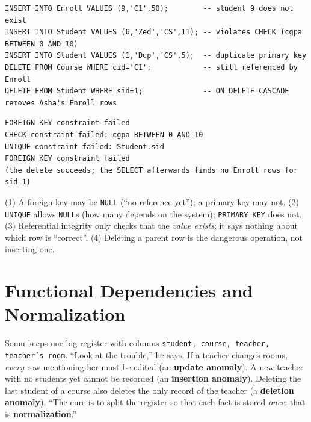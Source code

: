 \documentclass[11pt,a4paper]{article}
\begin{document}
\begin{lstlisting}[style=sql]
INSERT INTO Enroll VALUES (9,'C1',50);        -- student 9 does not exist
INSERT INTO Student VALUES (6,'Zed','CS',11); -- violates CHECK (cgpa BETWEEN 0 AND 10)
INSERT INTO Student VALUES (1,'Dup','CS',5);  -- duplicate primary key
DELETE FROM Course WHERE cid='C1';            -- still referenced by Enroll
DELETE FROM Student WHERE sid=1;              -- ON DELETE CASCADE removes Asha's Enroll rows
\end{lstlisting}
\begin{lstlisting}[style=out]
FOREIGN KEY constraint failed
CHECK constraint failed: cgpa BETWEEN 0 AND 10
UNIQUE constraint failed: Student.sid
FOREIGN KEY constraint failed
(the delete succeeds; the SELECT afterwards finds no Enroll rows for sid 1)
\end{lstlisting}
\begin{trap}
(1) A foreign key may be \texttt{NULL} (``no reference yet''); a primary key may not. (2) \texttt{UNIQUE} allows \texttt{NULL}s (how many depends on the system); \texttt{PRIMARY KEY} does not. (3) Referential integrity only checks that the \emph{value exists}; it says nothing about which row is ``correct''. (4) Deleting a parent row is the dangerous operation, not inserting one.
\end{trap}
\section{Functional Dependencies and Normalization}

\begin{story}
Somu keeps one big register with columns \texttt{student, course, teacher, teacher's room}. ``Look at the trouble,'' he says. If a teacher changes rooms, \emph{every} row mentioning her must be edited (an \textbf{update anomaly}). A new teacher with no students yet cannot be recorded (an \textbf{insertion anomaly}). Deleting the last student of a course also deletes the only record of the teacher (a \textbf{deletion anomaly}). ``The cure is to split the register so that each fact is stored \emph{once}: that is \textbf{normalization}.''
\end{story}
\end{document}
